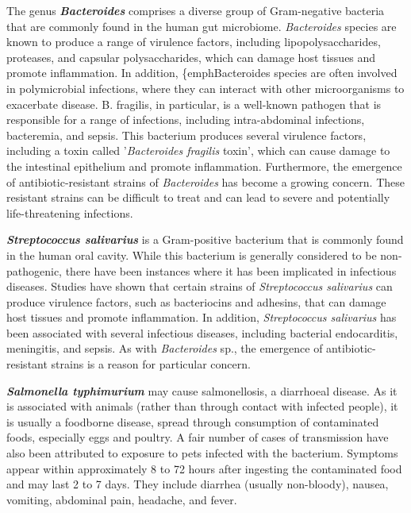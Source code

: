 The genus \textbf{\emph{Bacteroides}} comprises a diverse group of Gram-negative bacteria that are commonly found in the human gut microbiome. \emph{Bacteroides} species are known to produce a range of virulence factors, including lipopolysaccharides, proteases, and capsular polysaccharides, which can damage host tissues and promote inflammation. In addition, \{emph{Bacteroides} species are often involved in polymicrobial infections, where they can interact with other microorganisms to exacerbate disease. B. fragilis, in particular, is a well-known pathogen that is responsible for a range of infections, including intra-abdominal infections, bacteremia, and sepsis. This bacterium produces several virulence factors, including a toxin called ’\emph{Bacteroides fragilis} toxin’, which can cause damage to the intestinal epithelium and promote inflammation. Furthermore, the emergence of antibiotic-resistant strains of \emph{Bacteroides} has become a growing concern. These resistant strains can be difficult to treat and can lead to severe and potentially life-threatening infections.
\newline

\textbf{\emph{Streptococcus salivarius}} is a Gram-positive bacterium that is commonly found in the human oral cavity. While this bacterium is generally considered to be non-pathogenic, there have been instances where it has been implicated in infectious diseases. Studies have shown that certain strains of \emph{Streptococcus salivarius} can produce virulence factors, such as bacteriocins and adhesins, that can damage host tissues and promote inflammation. In addition, \emph{Streptococcus salivarius} has been associated with several infectious diseases, including bacterial endocarditis, meningitis, and sepsis. As with \emph{Bacteroides} sp., the emergence of antibiotic-resistant strains is a reason for particular concern.
\newline

\textbf{\emph{Salmonella typhimurium}} may cause salmonellosis, a diarrhoeal disease. As it is associated with animals (rather than through contact with infected people), it is usually a foodborne disease, spread through consumption of contaminated foods, especially eggs and poultry. A fair number of cases of transmission have also been attributed to exposure to pets infected with the bacterium. Symptoms appear within approximately 8 to 72 hours after ingesting the contaminated food and may last 2 to 7 days. They include diarrhea (usually non-bloody), nausea, vomiting, abdominal pain, headache, and fever.
\newline

